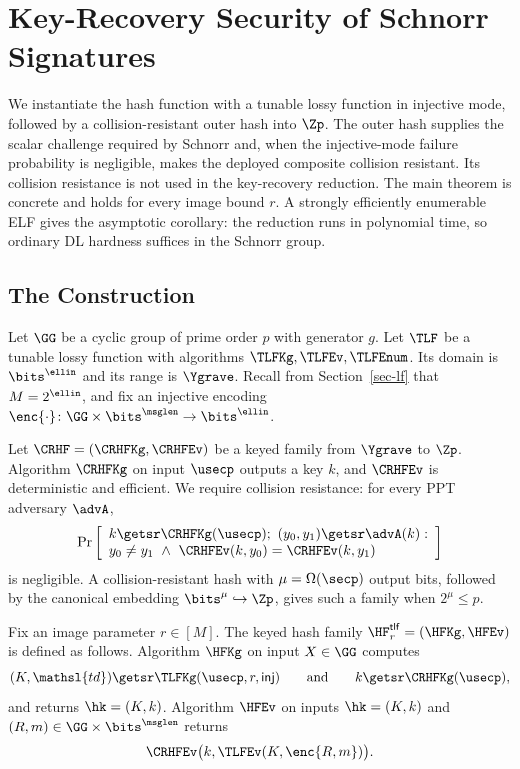 \section{Key-Recovery Security of Schnorr Signatures} \label{sec-lf-kr}

We instantiate the hash function with a tunable lossy function in injective mode, followed by a collision-resistant outer hash into $\Zp$. The outer hash supplies the scalar challenge required by Schnorr and, when the injective-mode failure probability is negligible, makes the deployed composite collision resistant. Its collision resistance is not used in the key-recovery reduction. The main theorem is concrete and holds for every image bound $r$. A strongly efficiently enumerable ELF gives the asymptotic corollary: the reduction runs in polynomial time, so ordinary DL hardness suffices in the Schnorr group.

\subsection{The Construction} \label{sec-lf-constr}

Let $\GG$ be a cyclic group of prime order $p$ with generator $g$. Let $\TLF$ be a tunable lossy function with algorithms $\TLFKg,\TLFEv,\TLFEnum$. Its domain is $\bits^{\ellin}$ and its range is $\Ygrave$. Recall from Section~\ref{sec-lf} that $M=2^{\ellin}$, and fix an injective encoding $\enc{\cdot}\colon\GG\times\bits^{\msglen}\to\bits^{\ellin}$.

Let $\CRHF=(\CRHFKg,\CRHFEv)$ be a keyed family from $\Ygrave$ to $\Zp$. Algorithm $\CRHFKg$ on input $\usecp$ outputs a key $k$, and $\CRHFEv$ is deterministic and efficient. We require collision resistance: for every PPT adversary $\advA$,
$$
\Pr\left[
\begin{array}{l}
k\getsr\CRHFKg(\usecp);\ (y_0,y_1)\getsr\advA(k):\\
y_0\ne y_1\ \land\ \CRHFEv(k,y_0)=\CRHFEv(k,y_1)
\end{array}
\right]
$$
is negligible. A collision-resistant hash with $\mu=\Omega(\secp)$ output bits, followed by the canonical embedding $\bits^\mu\hookrightarrow\Zp$, gives such a family when $2^\mu\le p$.

\begin{construction} \label{constr-lf}
Fix an image parameter $r\in[M]$. The keyed hash family $\HF^{\mathsf{tlf}}_r=(\HFKg,\HFEv)$ is defined as follows. Algorithm $\HFKg$ on input $X\in\GG$ computes
$$
(K,\mathsl{td})\getsr\TLFKg(\usecp,r,\mathsf{inj})
\qquad\text{and}\qquad
k\getsr\CRHFKg(\usecp),
$$
and returns $\hk=(K,k)$. Algorithm $\HFEv$ on inputs $\hk=(K,k)$ and $(R,m)\in\GG\times\bits^{\msglen}$ returns
$$
\CRHFEv\bigl(k,\TLFEv(K,\enc{R,m})\bigr).
$$
\end{construction}

